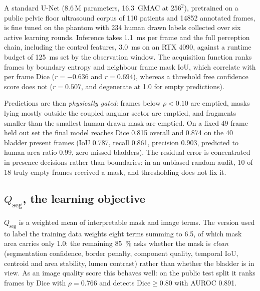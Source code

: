 \documentclass[conference]{IEEEtran}
\begin{document}
A standard U-Net (\num{8.6}\,M parameters, \SI{16.3}{\giga MAC} at $256^2$),
pretrained on a public pelvic floor ultrasound corpus of 110 patients and
\num{14852} annotated frames, is fine tuned on the phantom with 234 human drawn
labels collected over six active learning rounds. Inference takes
\SI{1.1}{\milli\second} per frame and the full perception chain, including the
control features, \SI{3.0}{\milli\second} on an RTX 4090, against a runtime
budget of \SI{125}{\milli\second} set by the observation window. The acquisition function ranks frames by boundary entropy and
neighbour frame mask IoU, which correlate with per frame Dice
($r = \num{-0.636}$ and $r = \num{+0.694}$), whereas a threshold free confidence
score does not ($r = \num{+0.507}$, and degenerate at \num{1.0} for empty
predictions).

Predictions are then \emph{physically gated}: frames below
$\rho < \num{0.10}$ are emptied, masks lying mostly outside the coupled angular
sector are emptied, and fragments smaller than the smallest human drawn mask are
emptied. On a fixed 49 frame held out set the final model reaches Dice
\num{0.815} overall and \num{0.874} on the 40 bladder present frames (IoU
\num{0.787}, recall \num{0.861}, precision \num{0.903}, predicted to human area
ratio \num{0.99}, zero missed bladders). The residual error is concentrated in
presence decisions rather than boundaries: in an unbiased random audit, 10 of 18
truly empty frames received a mask, and thresholding does not fix it.

\subsection{$Q_\mathrm{seg}$, the learning objective}

$Q_\mathrm{seg}$ is a weighted mean of interpretable mask and image terms. The
version used to label the training data weights eight terms summing to
\num{6.5}, of which mask area carries only \num{1.0}: the remaining
\SI{85}{\percent} asks whether the mask is \emph{clean} (segmentation
confidence, border penalty, component quality, temporal IoU, centroid and area
stability, lumen contrast) rather than whether the bladder is in view. As an
image quality score this behaves well: on the public test split it ranks frames
by Dice with $\rho = \num{0.766}$ and detects $\mathrm{Dice} \ge \num{0.80}$
with AUROC \num{0.891}.
\end{document}

